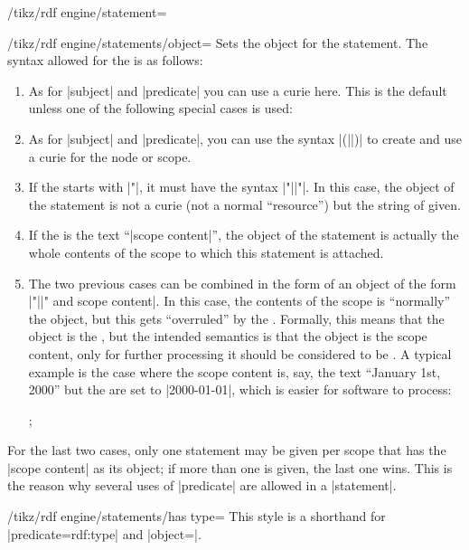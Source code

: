 \begin{key}{/tikz/rdf engine/statement=}
  \begin{key}{/tikz/rdf engine/statements/object=}
    Sets the object for the statement. The syntax allowed for the
     is as follows:
    \begin{enumerate}
    \item As for |subject| and |predicate| you can use a curie
      here. This is the default unless one of the following special
      cases is used:
    \item As for |subject| and |predicate|, you can use the syntax
      |(||)| to create and use a curie for
      the node or scope.
    \item If the  starts with |"|, it must have the
      syntax |"||"|. In this case, the object of the
      statement is not a curie (not a normal ``resource'') but the
      string of  given.
    \item If the  is the text ``|scope content|'', the
      object of the statement is actually the whole contents of the
      scope to which this statement is attached.
    \item The two previous cases can be combined in the form of an
      object of the form |"||" and scope content|. In
      this case, the contents of the scope is ``normally'' the object,
      but this gets ``overruled'' by the . Formally,
      this means that the object is the , but the
      intended semantics is that the object is the scope content, only
      for further processing it should be considered to be
      . A typical example is the case where the scope
      content is, say, the text ``January 1st, 2000'' but the
       are set to |2000-01-01|, which is easier for
      software to process:
\begin{codeexample}
;
\end{codeexample}
    \end{enumerate}
    For the last two cases, only one statement may be given per scope
    that has the |scope content| as its object; if more than one is
    given, the last one wins. This is the reason why several uses of
    |predicate| are allowed in a |statement|.
  \end{key}

  \begin{key}{/tikz/rdf engine/statements/has type=}
    This style is a shorthand for |predicate=rdf:type| and
    |object=|. 
  \end{key}
\end{key}





